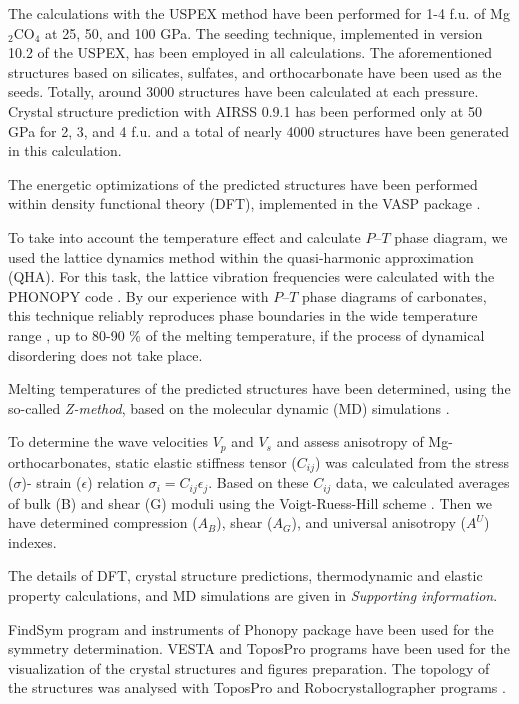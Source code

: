 \documentclass[a4paperm]{article}
\begin{document}
The calculations with the USPEX method \cite{uspex1,uspex2,uspex3,uspex_topology} have been performed for 1-4 f.u. of Mg$_2$CO$_4$ at 25, 50, and 100 GPa.
The seeding technique, implemented in version 10.2 of the USPEX, has been employed in all calculations.
The aforementioned structures based on silicates, sulfates, and orthocarbonate have been used as the seeds.
Totally, around 3000 structures have been calculated at each pressure.
Crystal structure prediction with AIRSS 0.9.1 \cite{airss1,airss2} has been performed only at 50 GPa for 2, 3, and 4 f.u. and a total of nearly 4000 structures have been generated in this calculation.

The energetic optimizations of the predicted structures have been performed within density functional theory (DFT), implemented in the VASP package \cite{vasp1,vasp2}.

To take into account the temperature effect and calculate $P$--$T$ phase diagram, we used the lattice dynamics method within the quasi-harmonic approximation (QHA).
For this task, the lattice vibration frequencies were calculated with the PHONOPY code \cite{phonopy}.
By our experience with $P$--$T$ phase diagrams of carbonates, this technique reliably reproduces phase boundaries in the wide temperature range \cite{gavr2019_alk, gavr2020_disarag, sagatova2020_ortho}, up to 80-90 \% of the melting temperature, if the process of dynamical disordering does not take place.

Melting temperatures of the predicted structures have been determined, using the so-called {\it Z-method}, based on the molecular dynamic (MD) simulations \cite{z-method}.

To determine the wave velocities $V_p$ and $V_s$ and assess anisotropy of Mg-orthocarbonates, static elastic stiffness tensor ($C_{ij}$) was calculated from the stress ($\sigma$)- strain ($\epsilon$) relation $\sigma_i=C_{ij}\epsilon_j$.
Based on these $C_{ij}$ data, we calculated averages of bulk (B) and shear (G) moduli using the Voigt-Ruess-Hill scheme \cite{hill1952,hill1963}.
 Then we have determined compression ($A_B$), shear ($A_G$), and universal anisotropy ($A^U$) indexes.

The details of DFT, crystal structure predictions, thermodynamic and elastic property calculations, and MD simulations are given in {\it Supporting information}.

FindSym program \cite{stokes2005} and instruments of Phonopy package have been used for the symmetry determination.
VESTA and ToposPro \cite{vesta,topos} programs have been used for the visualization of the crystal structures and figures preparation.
The topology of the structures was analysed with ToposPro and Robocrystallographer programs \cite{topos,robocrys}.
\end{document}

